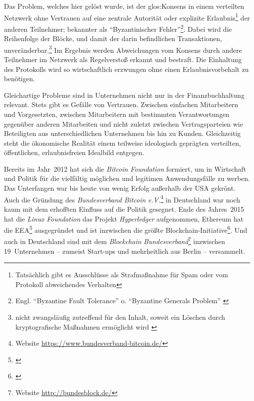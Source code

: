 Das Problem, welches hier gelöst wurde, ist der \gls{glos:Konsens} in einem verteilten Netzwerk ohne Vertrauen auf eine zentrale Autorität oder explizite Erlaubnis\footnote{Tatsächlich gibt es Ausschlüsse als Strafmaßnahme für Spam oder vom Protokoll abweichendes Verhalten} der anderen Teilnehmer; bekannter als \enquote{Byzantinischer Fehler}\footnote{Engl. \enquote{Byzantine Fault Tolerance} o. \enquote{Byzantine Generals Problem} \autocite{p:byzantine-original}}.
Dabei wird die Reihenfolge der Blöcke, und damit der darin befindlichen Transaktionen, unveränderbar.\footnote{nicht zwangsläufig zutreffend für den Inhalt, soweit ein Löschen durch kryptografische Maßnahmen ermöglicht wird \autocite{w:accenture-patent}}
Im Ergebnis werden Abweichungen vom Konsens durch andere Teilnehmer im Netzwerk als Regelverstoß erkannt und bestraft.
Die Einhaltung des Protokolls wird so wirtschaftlich erzwungen ohne einen Erlaubnisvorbehalt zu benötigen.


Gleichartige Probleme sind in Unternehmen nicht nur in der Finanzbuchhaltung relevant.
Stets gibt es Gefälle von Vertrauen.
Zwischen
einfachen Mitarbeitern und Vorgesetzten,
zwischen Mitarbeitern mit bestimmten Verantwortungen gegenüber anderen Mitarbeiten
und nicht zuletzt
zwischen Vertragsparteien wie \zB{} Beteiligten aus unterschiedlichen Unternehmen bis hin zu Kunden.
Gleichzeitig steht die ökonomische Realität einem teilweise ideologisch geprägten verteilten, öffentlichen, erlaubnisfreien Idealbild entgegen.


Bereits im Jahr~2012 hat sich die \emph{Bitcoin Foundation} formiert, um in Wirtschaft und Politik für die vielfältig möglichen und legitimen Anwendungsfälle zu werben.
Das Unterfangen war bis heute von wenig Erfolg außerhalb der USA gekrönt.
Auch die Gründung des \emph{Bundesverband Bitcoin e.V.}\footnote{Website \url{https://www.bundesverband-bitcoin.de/}} in Deutschland war noch kaum mit dem erhofften Einfluss auf die Politik gesegnet.
Ende des Jahres~2015 hat die \emph{Linux Foundation} das Projekt \emph{Hyperledger} aufgenommen, Ethereum hat die \gls{EEA}\footnote{%
\cite{p:eea}} ausgegründet und ist inzwischen die größte Blockchain-Initiative\footnote{\cite{w:eea:launch}}.
Und auch in Deutschland sind mit dem \emph{Blockchain Bundesverband}\footnote{Website \url{http://bundesblock.de/}} inzwischen 19~Unternehmen -- zumeist Start-ups und mehrheitlich aus Berlin -- versammelt.

